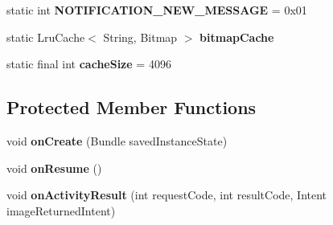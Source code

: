 \begin{DoxyCompactItemize}
\item 
\hypertarget{classcom_1_1lbros_1_1epicchat_1_1_main_activity_ad813384b439231b40555253f7de0380e}{static int {\bfseries N\-O\-T\-I\-F\-I\-C\-A\-T\-I\-O\-N\-\_\-\-N\-E\-W\-\_\-\-M\-E\-S\-S\-A\-G\-E} = 0x01}\label{classcom_1_1lbros_1_1epicchat_1_1_main_activity_ad813384b439231b40555253f7de0380e}

\item 
\hypertarget{classcom_1_1lbros_1_1epicchat_1_1_main_activity_a1a61670c1c41441c47015f569ab29a7b}{static Lru\-Cache$<$ String, Bitmap $>$ {\bfseries bitmap\-Cache}}\label{classcom_1_1lbros_1_1epicchat_1_1_main_activity_a1a61670c1c41441c47015f569ab29a7b}

\item 
\hypertarget{classcom_1_1lbros_1_1epicchat_1_1_main_activity_a26e1cfc453c050ca770b301d0733217d}{static final int {\bfseries cache\-Size} = 4096}\label{classcom_1_1lbros_1_1epicchat_1_1_main_activity_a26e1cfc453c050ca770b301d0733217d}

\end{DoxyCompactItemize}
\subsection*{Protected Member Functions}
\begin{DoxyCompactItemize}
\item 
\hypertarget{classcom_1_1lbros_1_1epicchat_1_1_main_activity_a44addacc4882965d3a28372d31147b31}{void {\bfseries on\-Create} (Bundle saved\-Instance\-State)}\label{classcom_1_1lbros_1_1epicchat_1_1_main_activity_a44addacc4882965d3a28372d31147b31}

\item 
\hypertarget{classcom_1_1lbros_1_1epicchat_1_1_main_activity_ad7c0aed2a7dba9d40ec1dc02bdf59b18}{void {\bfseries on\-Resume} ()}\label{classcom_1_1lbros_1_1epicchat_1_1_main_activity_ad7c0aed2a7dba9d40ec1dc02bdf59b18}

\item 
\hypertarget{classcom_1_1lbros_1_1epicchat_1_1_main_activity_adcad1716d99066fe45fa6e059edc53c0}{void {\bfseries on\-Activity\-Result} (int request\-Code, int result\-Code, Intent image\-Returned\-Intent)}\label{classcom_1_1lbros_1_1epicchat_1_1_main_activity_adcad1716d99066fe45fa6e059edc53c0}

\end{DoxyCompactItemize}


